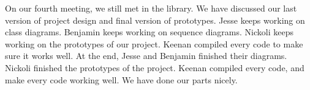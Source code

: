 \documentclass[12pt]{article}
\begin{document}
\par
On our fourth meeting, we still met in the library. We have discussed our last version of project design and final version of prototypes. Jesse keeps working on class diagrams. Benjamin keeps working on sequence diagrams. Nickoli keeps working on the prototypes of our project. Keenan compiled every code to make sure it works well. At the end, Jesse and Benjamin finished their diagrams. Nickoli finished the prototypes of the project. Keenan compiled every code, and make every code working well. We have done our parts nicely. \\

\cite{rubtut}



\end{document}
